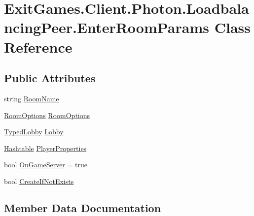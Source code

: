 \hypertarget{class_exit_games_1_1_client_1_1_photon_1_1_loadbalancing_peer_1_1_enter_room_params}{}\section{Exit\+Games.\+Client.\+Photon.\+Loadbalancing\+Peer.\+Enter\+Room\+Params Class Reference}
\label{class_exit_games_1_1_client_1_1_photon_1_1_loadbalancing_peer_1_1_enter_room_params}
\subsection*{Public Attributes}
\begin{DoxyCompactItemize}
\item 
string \hyperlink{class_exit_games_1_1_client_1_1_photon_1_1_loadbalancing_peer_1_1_enter_room_params_a72afef2017538b11abfaac5d14f2b176}{Room\+Name}
\item 
\hyperlink{class_room_options}{Room\+Options} \hyperlink{class_exit_games_1_1_client_1_1_photon_1_1_loadbalancing_peer_1_1_enter_room_params_ac6674e44fe94492bf0d12bf6458c0444}{Room\+Options}
\item 
\hyperlink{class_typed_lobby}{Typed\+Lobby} \hyperlink{class_exit_games_1_1_client_1_1_photon_1_1_loadbalancing_peer_1_1_enter_room_params_a1ce2f0a94f4aab598b206be09737eed0}{Lobby}
\item 
\hyperlink{_extensions_8cs_afa613ef589c02dbd94acc273b62cdcfd}{Hashtable} \hyperlink{class_exit_games_1_1_client_1_1_photon_1_1_loadbalancing_peer_1_1_enter_room_params_a8f44933e23de1234e376a99b9f8a9a90}{Player\+Properties}
\item 
bool \hyperlink{class_exit_games_1_1_client_1_1_photon_1_1_loadbalancing_peer_1_1_enter_room_params_a3cc694d9421937d423e426396f765bbc}{On\+Game\+Server} = true
\item 
bool \hyperlink{class_exit_games_1_1_client_1_1_photon_1_1_loadbalancing_peer_1_1_enter_room_params_a56bbfc86a4c69a7b15aa0efdee059c4e}{Create\+If\+Not\+Exists}
\end{DoxyCompactItemize}


\subsection{Member Data Documentation}
